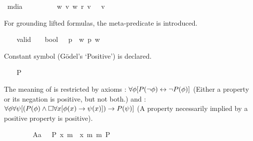 \begin{isabellebody}
\ mdia\ {\isacharcolon}{\isacharcolon}\ {\isachardoublequoteopen}{\isasymsigma}\ {\isasymRightarrow}\ {\isasymsigma}{\isachardoublequoteclose}\ {\isacharparenleft}{\isachardoublequoteopen}{\isasymdiamond}{\isachardoublequoteclose}{\isacharparenright}\ \ {\isachardoublequoteopen}{\isasymdiamond}\ {\isasymphi}\ {\isasymequiv}\ {\isacharparenleft}{\isasymlambda}w{\isachardot}\ {\isasymexists}v{\isachardot}\ w\ r\ v\ {\isasymand}\ {\isasymphi}\ v{\isacharparenright}{\isachardoublequoteclose}%
\begin{isamarkuptext}%
For grounding lifted formulas, the meta-predicate  is introduced.%
\end{isamarkuptext}%
\isamarkuptrue%
\ \ \isamarkupfalse%
\ valid\ {\isacharcolon}{\isacharcolon}\ {\isachardoublequoteopen}{\isasymsigma}\ {\isasymRightarrow}\ bool{\isachardoublequoteclose}\ {\isacharparenleft}{\isachardoublequoteopen}{\isacharbrackleft}{\isacharunderscore}{\isacharbrackright}{\isachardoublequoteclose}{\isacharparenright}\ \ {\isachardoublequoteopen}{\isacharbrackleft}p{\isacharbrackright}\ {\isasymequiv}\ {\isasymforall}w{\isachardot}\ p\ w{\isachardoublequoteclose}%
\isamarkuptrue%
%
\begin{isamarkuptext}%
Constant symbol  (G\"odel's `Positive') is declared.%
\end{isamarkuptext}%
\isamarkuptrue%
\ \ \isamarkupfalse%
\ P\ {\isacharcolon}{\isacharcolon}\ {\isachardoublequoteopen}{\isacharparenleft}{\isasymmu}\ {\isasymRightarrow}\ {\isasymsigma}{\isacharparenright}\ {\isasymRightarrow}\ {\isasymsigma}{\isachardoublequoteclose}%
\begin{isamarkuptext}%
The meaning of  is restricted by axioms : $\forall \phi 
[P(\neg \phi) \leftrightarrow \neg P(\phi)]$ (Either a property or its negation is positive, but not both.) 
and : $\forall \phi \forall \psi [(P(\phi) \wedge \Box \forall x [\phi(x) \rightarrow \psi(x)]) 
\rightarrow P(\psi)]$ (A property necessarily implied by a positive property is positive).%
\end{isamarkuptext}%
\isamarkuptrue%
\ \ \isamarkupfalse%
\ \isanewline
\ \ \ \ A{}a{\isacharcolon}\ {\isachardoublequoteopen}{\isacharbrackleft}{\isasymPi}\ {\isacharparenleft}{\isasymlambda}{\isasymPhi}{\isachardot}\ P\ {\isacharparenleft}{\isasymlambda}x{\isachardot}\ m{\isasymnot}\ {\isacharparenleft}{\isasymPhi}\ x{\isacharparenright}{\isacharparenright}\ m{\isasymRightarrow}\ m{\isasymnot}\ {\isacharparenleft}P\ {\isasymPhi}{\isacharparenright}{\isacharparenright}{\isacharbrackright}{\isachardoublequoteclose}\ \isanewline

\end{isabellebody}
